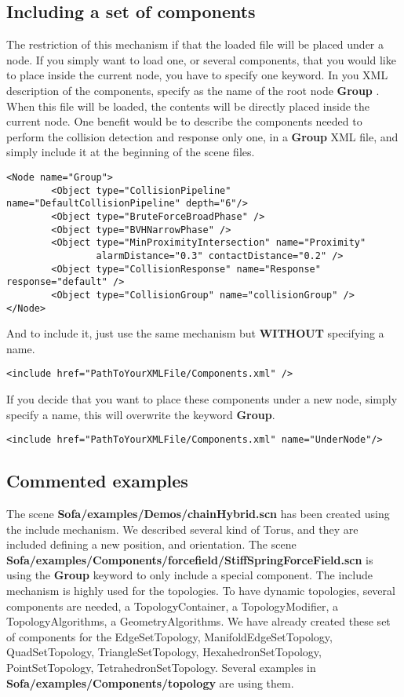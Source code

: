 \subsection{Including a set of components}
The restriction of this mechanism if that the loaded file will be placed under a node. If you simply want to load one, or several components, that you would like to place inside the current node, you have to specify one keyword.
In you XML description of the components, specify as the name of the root node { \bf Group }. When this file will be loaded, the contents will be directly placed inside the current node.
One benefit would be to describe the components needed to perform the collision detection and response only one, in a { \bf Group } XML file, and simply include it at the beginning of the scene files.
\begin{verbatim}
<Node name="Group">
        <Object type="CollisionPipeline" name="DefaultCollisionPipeline" depth="6"/>
        <Object type="BruteForceBroadPhase" />
        <Object type="BVHNarrowPhase" />
        <Object type="MinProximityIntersection" name="Proximity" 
                alarmDistance="0.3" contactDistance="0.2" />
        <Object type="CollisionResponse" name="Response" response="default" />
        <Object type="CollisionGroup" name="collisionGroup" />
</Node>
\end{verbatim}

And to include it, just use the same mechanism but { \bf WITHOUT} specifying a name.
\begin{verbatim}
<include href="PathToYourXMLFile/Components.xml" />
\end{verbatim}

If you decide that you want to place these components under a new node, simply specify a name, this will overwrite the keyword { \bf Group}.
\begin{verbatim}
<include href="PathToYourXMLFile/Components.xml" name="UnderNode"/>
\end{verbatim}

\subsection{Commented examples}
The scene { \bf Sofa/examples/Demos/chainHybrid.scn} has been created using the include mechanism. We described several kind of Torus, and they are included defining a new position, and orientation.
The scene { \bf Sofa/examples/Components/forcefield/StiffSpringForceField.scn} is using the { \bf Group} keyword to only include a special component.
The include mechanism is highly used for the topologies. To have dynamic topologies, several components are needed, a TopologyContainer, a TopologyModifier, a TopologyAlgorithms, a GeometryAlgorithms. We have already created these set of components for the EdgeSetTopology, ManifoldEdgeSetTopology, QuadSetTopology, TriangleSetTopology, HexahedronSetTopology, PointSetTopology, TetrahedronSetTopology. Several examples in {\bf Sofa/examples/Components/topology} are using them.
